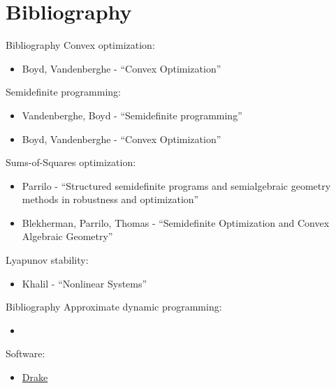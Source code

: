 \documentclass[aspectratio=169]{beamer}
\begin{document}
\section{Bibliography}
\begin{frame}{Bibliography}
\footnotesize
Convex optimization:
\begin{itemize}
\item
Boyd, Vandenberghe - ``Convex Optimization''
\end{itemize}
Semidefinite programming:
\begin{itemize}
\item
Vandenberghe, Boyd - ``Semidefinite programming''
\item
Boyd, Vandenberghe - ``Convex Optimization''
\end{itemize}
Sums-of-Squares optimization:
\begin{itemize}
\item
Parrilo - ``Structured semidefinite programs and semialgebraic geometry methods in robustness and optimization''
\item
Blekherman, Parrilo, Thomas - ``Semidefinite Optimization and Convex Algebraic Geometry''
\end{itemize}
Lyapunov stability:
\begin{itemize}
\item
Khalil - ``Nonlinear Systems''
\end{itemize}
\end{frame}

\begin{frame}{Bibliography}
\footnotesize
Approximate dynamic programming:
\begin{itemize}
\item
\end{itemize}
Software:
\begin{itemize}
\item
\href{https://drake.mit.edu}{{\color{blue}Drake}}
\end{itemize}
\end{frame}
\end{document}
